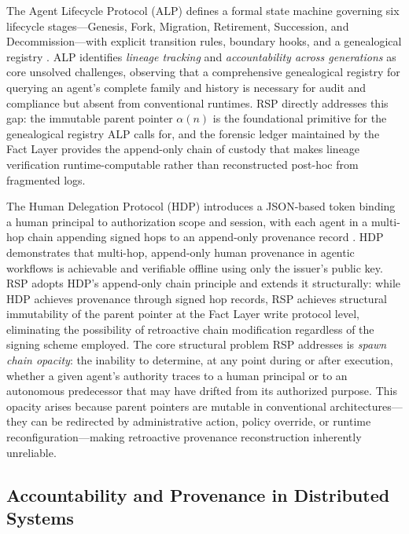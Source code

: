 The Agent Lifecycle Protocol (ALP) defines a formal state machine governing six lifecycle stages---Genesis, Fork, Migration, Retirement, Succession, and Decommission---with explicit transition rules, boundary hooks, and a genealogical registry \cite{alp2025}. ALP identifies \emph{lineage tracking} and \emph{accountability across generations} as core unsolved challenges, observing that a comprehensive genealogical registry for querying an agent's complete family and history is necessary for audit and compliance but absent from conventional runtimes. RSP directly addresses this gap: the immutable parent pointer $\alpha(n)$ is the foundational primitive for the genealogical registry ALP calls for, and the forensic ledger maintained by the Fact Layer provides the append-only chain of custody that makes lineage verification runtime-computable rather than reconstructed post-hoc from fragmented logs.

The Human Delegation Protocol (HDP) introduces a JSON-based token binding a human principal to authorization scope and session, with each agent in a multi-hop chain appending signed hops to an append-only provenance record \cite{hdp-draft,hdp-draft-2}. HDP demonstrates that multi-hop, append-only human provenance in agentic workflows is achievable and verifiable offline using only the issuer's public key. RSP adopts HDP's append-only chain principle and extends it structurally: while HDP achieves provenance through signed hop records, RSP achieves structural immutability of the parent pointer at the Fact Layer write protocol level, eliminating the possibility of retroactive chain modification regardless of the signing scheme employed. The core structural problem RSP addresses is \emph{spawn chain opacity}: the inability to determine, at any point during or after execution, whether a given agent's authority traces to a human principal or to an autonomous predecessor that may have drifted from its authorized purpose. This opacity arises because parent pointers are mutable in conventional architectures---they can be redirected by administrative action, policy override, or runtime reconfiguration---making retroactive provenance reconstruction inherently unreliable.

\subsection{Accountability and Provenance in Distributed Systems}

